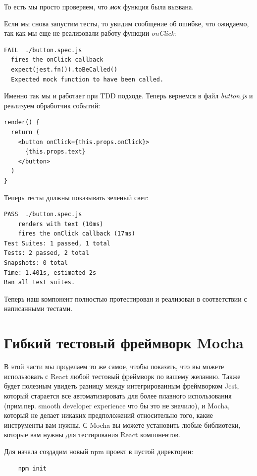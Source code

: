То есть мы просто проверяем, что \textit{мок} функция была вызвана.

Если мы снова запустим тесты, то увидим сообщение об ошибке, что ожидаемо, так как мы еще не реализовали работу функции \textit{onClick}:

\begin{lstlisting}
FAIL  ./button.spec.js
  fires the onClick callback
  expect(jest.fn()).toBeCalled()
  Expected mock function to have been called.
\end{lstlisting}

Именно так мы и работает при TDD подходе. Теперь вернемся в файл \textit{button.js} и реализуем обработчик событий:

\begin{lstlisting}
render() {
  return (
    <button onClick={this.props.onClick}>
      {this.props.text}
    </button>
  )
}
\end{lstlisting}

Теперь тесты должны показывать зеленый свет:

\begin{lstlisting}
PASS  ./button.spec.js
    renders with text (10ms)
    fires the onClick callback (17ms)
Test Suites: 1 passed, 1 total
Tests: 2 passed, 2 total
Snapshots: 0 total
Time: 1.401s, estimated 2s 
Ran all test suites.
\end{lstlisting}

Теперь наш компонент полностью протестирован и реализован в соответствии с написанными тестами.


\section{Гибкий тестовый фреймворк Mocha}

В этой части мы проделаем то же самое, чтобы показать, что вы можете использовать с React любой тестовый фреймворк по вашему желанию. Также будет полезным увидеть разницу между интегрированным фреймворком Jest, который старается все автоматизировать для более плавного использования (прим.пер. smooth developer experience что бы это не значило), и Mocha, который не делает никаких предположений относительно того, какие инструменты вам нужны. С Mocha вы можете установить любые библиотеки, которые вам нужны для тестирования React компонентов.

Для начала создадим новый npm проект в пустой директории:

\begin{lstlisting}
	npm init
\end{lstlisting}

